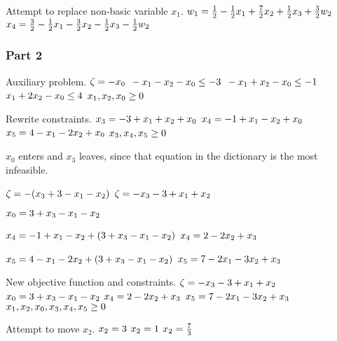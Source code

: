 \documentclass[17pt]{extarticle}
\begin{document}
\bigskip Attempt to replace non-basic variable $x_1$.
$\\ w_1 = \frac{1}{2} - \frac{1}{2}x_1 + \frac{7}{2}x_2 + \frac{1}{2}x_3 + \frac{3}{2}w_2$
$\\ x_4 = \frac{3}{2} - \frac{1}{2}x_1 - \frac{3}{2}x_2 - \frac{1}{2}x_3 - \frac{1}{2}w_2$

\subsubsection*{Part 2}
Auxiliary problem.
$\\\zeta = -x_0$
$\\ -x_1 - x_2 - x_0 \leq -3$
$\\ -x_1 + x_2 - x_0 \leq -1$
$\\ x_1 + 2x_2 - x_0 \leq 4$
$\\ x_1, x_2, x_0 \geq 0$

\bigskip Rewrite constraints.
$\\ x_3 = - 3 + x_1 + x_2 + x_0$
$\\ x_4 = - 1 + x_1 - x_2 + x_0$
$\\ x_5 = 4 - x_1 - 2x_2 + x_0$
$\\ x_3, x_4, x_5 \geq 0$

\bigskip $x_0$ enters and $x_3$ leaves, since that equation in the dictionary is the most infeasible.

$\\\zeta = -(x_3 + 3 - x_1 - x_2)$
$\\\zeta = -x_3 - 3 + x_1 + x_2$

$\\ x_0 = 3 + x_3 - x_1 - x_2$

$\\ x_4 = - 1 + x_1 - x_2 + (3 + x_3 - x_1 - x_2)$
$\\ x_4 = 2 - 2x_2 + x_3$

$\\ x_5 = 4 - x_1 - 2x_2 + (3 + x_3 - x_1 - x_2)$
$\\ x_5 = 7 - 2x_1 - 3x_2 + x_3$

\bigskip New objective function and constraints.
$\\ \zeta = -x_3 - 3 + x_1 + x_2$
$\\ x_0 = 3 + x_3 - x_1 - x_2$
$\\ x_4 = 2 - 2x_2 + x_3$
$\\ x_5 = 7 - 2x_1 - 3x_2 + x_3$
$\\ x_1, x_2, x_0, x_3, x_4, x_5 \geq 0$

\bigskip Attempt to move $x_2$.
$\\ x_2 = 3$
$\\ x_2 = 1$
$\\ x_2 = \frac{7}{3}$
\end{document}
